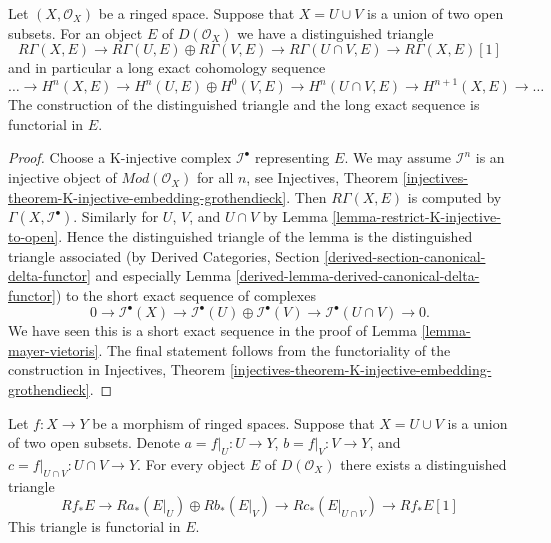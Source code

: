 \begin{lemma}
\label{lemma-unbounded-mayer-vietoris}
Let $(X, \mathcal{O}_X)$ be a ringed space. Suppose that
$X = U \cup V$ is a union of two open subsets. For an object $E$
of $D(\mathcal{O}_X)$ we have a distinguished triangle
$$
R\Gamma(X, E) \to R\Gamma(U, E) \oplus R\Gamma(V, E) \to
R\Gamma(U \cap V, E) \to R\Gamma(X, E)[1]
$$
and in particular a long exact cohomology sequence
$$
\ldots \to
H^n(X, E) \to
H^n(U, E) \oplus H^0(V, E) \to
H^n(U \cap V, E) \to
H^{n + 1}(X, E) \to \ldots
$$
The construction of the distinguished triangle and the
long exact sequence is functorial in $E$.
\end{lemma}

\begin{proof}
Choose a K-injective complex $\mathcal{I}^\bullet$
representing $E$. We may assume $\mathcal{I}^n$ is an injective
object of $\textit{Mod}(\mathcal{O}_X)$ for all $n$, see
Injectives, Theorem
\ref{injectives-theorem-K-injective-embedding-grothendieck}.
Then $R\Gamma(X, E)$ is computed by $\Gamma(X, \mathcal{I}^\bullet)$.
Similarly for $U$, $V$, and $U \cap V$ by
Lemma \ref{lemma-restrict-K-injective-to-open}.
Hence the distinguished triangle of the lemma is the distinguished
triangle associated (by
Derived Categories, Section
\ref{derived-section-canonical-delta-functor} and especially
Lemma \ref{derived-lemma-derived-canonical-delta-functor})
to the short exact sequence of complexes
$$
0 \to
\mathcal{I}^\bullet(X) \to
\mathcal{I}^\bullet(U) \oplus \mathcal{I}^\bullet(V) \to
\mathcal{I}^\bullet(U \cap V) \to
0.
$$
We have seen this is a short exact sequence in the proof of
Lemma \ref{lemma-mayer-vietoris}.
The final statement follows from the functoriality of the construction
in Injectives, Theorem
\ref{injectives-theorem-K-injective-embedding-grothendieck}.
\end{proof}

\begin{lemma}
\label{lemma-unbounded-relative-mayer-vietoris}
Let $f : X \to Y$ be a morphism of ringed spaces.
Suppose that $X = U \cup V$ is a union of two open subsets.
Denote $a = f|_U : U \to Y$, $b = f|_V : V \to Y$, and
$c = f|_{U \cap V} : U \cap V \to Y$.
For every object $E$ of $D(\mathcal{O}_X)$ there exists a
distinguished triangle
$$
Rf_*E \to
Ra_*(E|_U) \oplus Rb_*(E|_V) \to
Rc_*(E|_{U \cap V}) \to
Rf_*E[1]
$$
This triangle is functorial in $E$.
\end{lemma}

